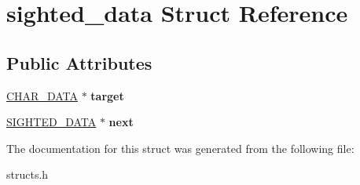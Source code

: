 \hypertarget{structsighted__data}{\section{sighted\-\_\-data Struct Reference}
\label{structsighted__data}
}
\subsection*{Public Attributes}
\begin{DoxyCompactItemize}
\item 
\hypertarget{structsighted__data_a22ad34f9af75e023eb149ffdba2fd59b}{\hyperlink{structchar__data}{C\-H\-A\-R\-\_\-\-D\-A\-T\-A} $\ast$ {\bfseries target}}\label{structsighted__data_a22ad34f9af75e023eb149ffdba2fd59b}

\item 
\hypertarget{structsighted__data_af7e3404f0cfd3687d2548ac87f34afe8}{\hyperlink{structsighted__data}{S\-I\-G\-H\-T\-E\-D\-\_\-\-D\-A\-T\-A} $\ast$ {\bfseries next}}\label{structsighted__data_af7e3404f0cfd3687d2548ac87f34afe8}

\end{DoxyCompactItemize}


The documentation for this struct was generated from the following file\-:\begin{DoxyCompactItemize}
\item 
structs.\-h\end{DoxyCompactItemize}
